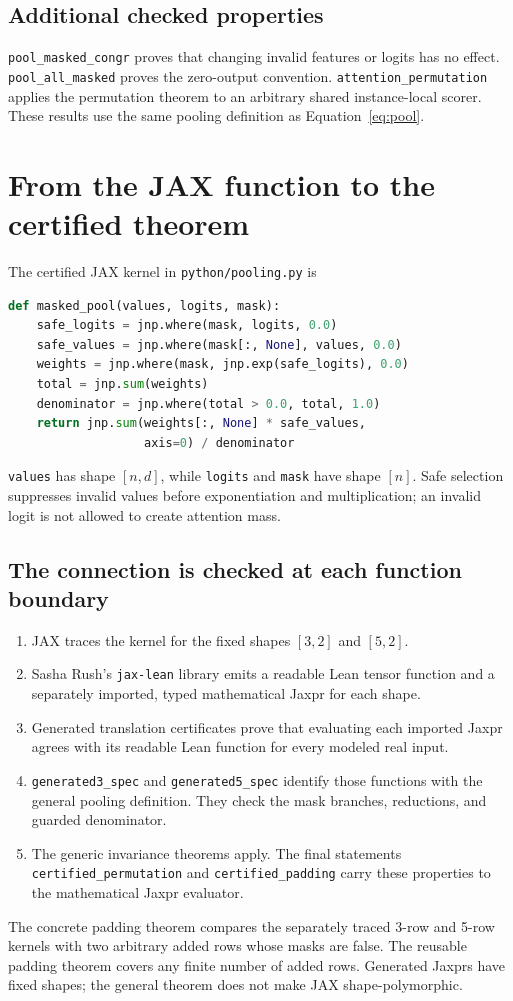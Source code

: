 \documentclass[11pt]{article}
\newcommand{\code}[1]{\nolinkurl{#1}}
\begin{document}
\subsection*{Additional checked properties}
\code{pool_masked_congr} proves that changing invalid features or logits has
no effect. \code{pool_all_masked} proves the zero-output convention.
\code{attention_permutation} applies the permutation theorem to an arbitrary
shared instance-local scorer. These results use the same pooling definition
as Equation~\eqref{eq:pool}.

\newpage
\section{From the JAX function to the certified theorem}
The certified JAX kernel in \code{python/pooling.py} is
\begin{lstlisting}[language=Python]
def masked_pool(values, logits, mask):
    safe_logits = jnp.where(mask, logits, 0.0)
    safe_values = jnp.where(mask[:, None], values, 0.0)
    weights = jnp.where(mask, jnp.exp(safe_logits), 0.0)
    total = jnp.sum(weights)
    denominator = jnp.where(total > 0.0, total, 1.0)
    return jnp.sum(weights[:, None] * safe_values,
                   axis=0) / denominator
\end{lstlisting}
\code{values} has shape $[n,d]$, while \code{logits} and \code{mask} have
shape $[n]$. Safe selection suppresses invalid values before exponentiation
and multiplication; an invalid logit is not allowed to create attention mass.

\subsection*{The connection is checked at each function boundary}
\begin{enumerate}
\item JAX traces the kernel for the fixed shapes $[3,2]$ and $[5,2]$.
\item Sasha Rush's \code{jax-lean} library emits a readable Lean tensor function
and a separately imported, typed mathematical Jaxpr for each shape.
\item Generated translation certificates prove that evaluating each imported
Jaxpr agrees with its readable Lean function for every modeled real input.
\item \code{generated3_spec} and \code{generated5_spec} identify those
functions with the general pooling definition. They check the mask branches,
reductions, and guarded denominator.
\item The generic invariance theorems apply. The final statements
\code{certified_permutation} and \code{certified_padding}
carry these properties to the mathematical Jaxpr evaluator.
\end{enumerate}
The concrete padding theorem compares the separately traced 3-row and 5-row
kernels with two arbitrary added rows whose masks are false. The reusable
padding theorem covers any finite number of added rows. Generated Jaxprs
have fixed shapes; the general theorem does not make JAX shape-polymorphic.
\end{document}
